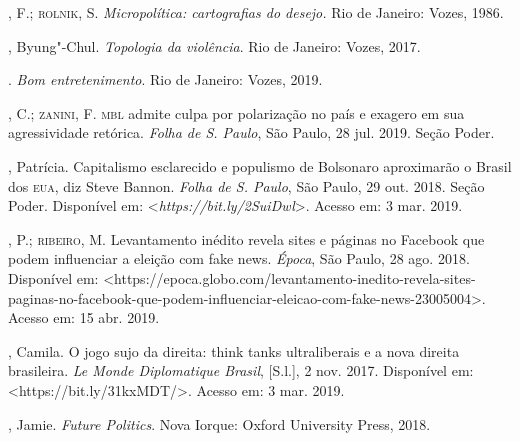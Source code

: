 \begin{bibliohedra}
, F.; \textsc{rolnik}, S. \emph{Micropolítica: cartografias do desejo.}
Rio de Janeiro: Vozes, 1986.

, Byung"-Chul. \emph{Topologia da violência}. Rio de Janeiro: Vozes,
2017.

\titidem. \emph{Bom entretenimento}. Rio de Janeiro: Vozes, 2019.

, C.; \textsc{zanini}, F. \textsc{mbl} admite culpa por polarização no país e
exagero em sua agressividade retórica. \emph{Folha de S. Paulo}, São
Paulo, 28 jul. 2019. Seção Poder.

, Patrícia. Capitalismo esclarecido e populismo de Bolsonaro
aproximarão o Brasil dos \textsc{eua}, diz Steve Bannon. \emph{Folha de S.
Paulo}, São Paulo, 29 out. 2018. Seção Poder. Disponível em:
\textless{}\emph{https://bit.ly/2SuiDwl}\textgreater{}.
Acesso em: 3 mar. 2019.

, P.; \textsc{ribeiro}, M. Levantamento inédito revela sites e páginas
no Facebook que podem influenciar a eleição com fake news. \emph{Época},
São Paulo, 28 ago. 2018. Disponível em:
\textless{}https://epoca.globo.com/levantamento-inedito-revela-sites-paginas-no-facebook-que-podem-influenciar-eleicao-com-fake-news-23005004\textgreater{}.
Acesso em: 15 abr. 2019.

, Camila. O jogo sujo da direita: think tanks ultraliberais e a
nova direita brasileira. \emph{Le Monde Diplomatique Brasil},
{[}S.l.{]}, 2 nov. 2017. Disponível em:
\textless{}https://bit.ly/31kxMDT/\textgreater{}.
Acesso em: 3 mar. 2019.

, Jamie. \emph{Future Politics}. Nova Iorque: Oxford University
Press, 2018.
\end{bibliohedra}


\begin{flushright}
\end{flushright}

